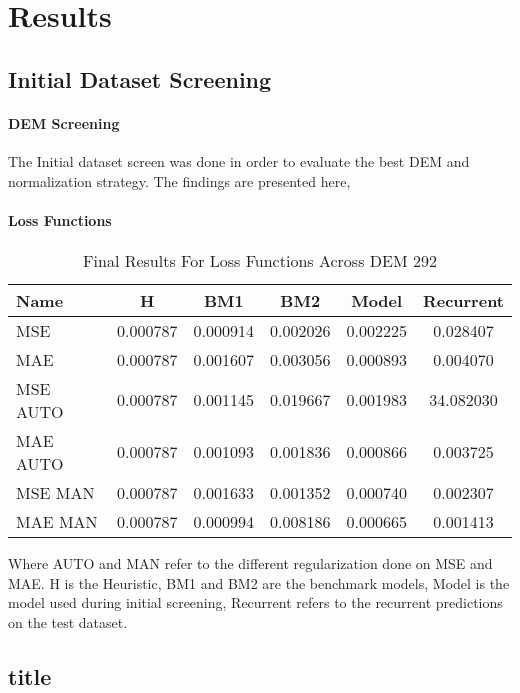 
\chapter{Results} %
\label{Chapter5} %

\section{Initial Dataset Screening}
\subsubsection*{DEM Screening}
The Initial dataset screen was done in order to evaluate the best DEM and normalization strategy. The findings are presented here,


\subsubsection*{Loss Functions}
\begin{table}[h]
	\centering
	\caption{Final Results For Loss Functions Across DEM 292}
	\label{tab:sample}
	\begin{tabular}{p{3cm}ccccc}
		\toprule
		Name &  H &  BM1 &  BM2 &  Model &  Recurrent \\
		\midrule
		MSE &       0.000787 &        0.000914 &        0.002026 &   0.002225 &            0.028407 \\
		MAE &       0.000787 &        0.001607 &        0.003056 &   0.000893 &            0.004070 \\
		MSE AUTO &       0.000787 &        0.001145 &        0.019667 &   0.001983 &           34.082030 \\
		MAE AUTO &       0.000787 &        0.001093 &        0.001836 &   0.000866 &            0.003725 \\
		MSE MAN &       0.000787 &        0.001633 &        0.001352 &   0.000740 &            0.002307 \\
		MAE MAN &       0.000787 &        0.000994 &        0.008186 &   0.000665 &            0.001413 \\
		\bottomrule
	\end{tabular}
\end{table}
Where AUTO and MAN refer to the different regularization done on MSE and MAE. H is the Heuristic, BM1 and BM2 are the benchmark models, Model is the model used during initial screening, Recurrent refers to the recurrent predictions on the test dataset.

\section{title}
